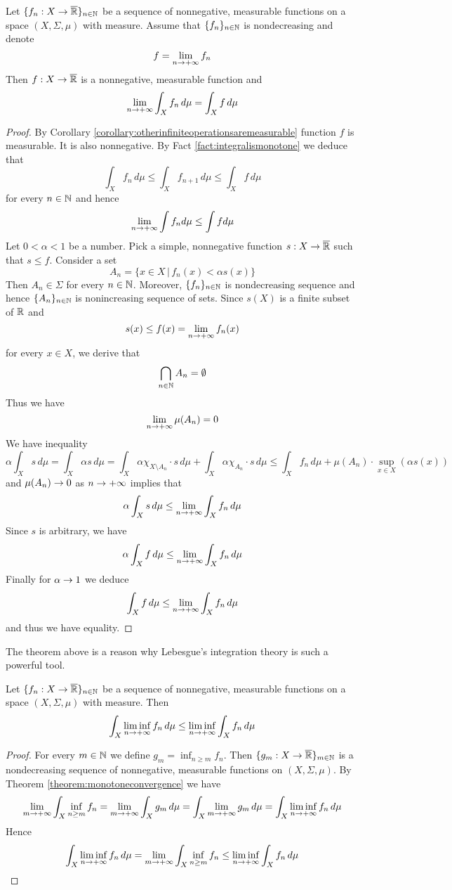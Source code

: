 \begin{theorem}\label{theorem:monotoneconvergence}
Let $\{f_n:X\rightarrow \overline{{\mathbb R}}\}_{n\in {\mathbb N}}$ be a sequence of nonnegative, measurable functions on a space $(X,\Sigma,\mu)$ with measure. Assume that $\{f_n\}_{n\in {\mathbb N}}$ is nondecreasing and denote
$$f = \lim_{n\rightarrow +\infty}f_n$$
Then $f:X\rightarrow \overline{{\mathbb R}}$ is a nonnegative, measurable function and
$$\lim_{n\rightarrow +\infty}\int_X f_n\, d\mu = \int_X f\, d\mu$$
\end{theorem}
\begin{proof}
By Corollary \ref{corollary:otherinfiniteoperationsaremeasurable} function $f$ is measurable. It is also nonnegative. By Fact \ref{fact:integralismonotone} we deduce that
$$\int_X f_n\,d\mu \leq \int_X f_{n+1}\,d\mu \leq \int_X f\, d\mu$$
for every $n\in {\mathbb N}$ and hence 
$$\lim_{n\rightarrow +\infty}\int f_n d\mu \leq \int f d\mu$$
Let $0 < \alpha < 1$ be a number. Pick a simple, nonnegative function $s:X\rightarrow \overline{{\mathbb R}}$ such that $s\leq f$. Consider a set
$$A_n = \big\{x\in X\,\big|\, f_n(x)< \alpha s(x)\big\}$$
Then $A_n\in \Sigma$ for every $n\in {\mathbb N}$. Moreover, $\{f_n\}_{n\in {\mathbb N}}$ is nondecreasing sequence and hence $\{A_n\}_{n\in {\mathbb N}}$ is nonincreasing sequence of sets. Since $s(X)$ is a finite subset of ${\mathbb R}$ and
$$s(x)\leq f(x) = \lim_{n\rightarrow +\infty}f_n(x)$$
for every $x\in X$, we derive that
$$\bigcap_{n\in {\mathbb N}}A_n = \emptyset$$
Thus we have
$$\lim_{n\rightarrow +\infty}\mu(A_n)=0$$
We have inequality
$$\alpha  \int_Xs\,d\mu = \int_X\alpha s\,d\mu = \int_X \alpha \chi_{X\setminus A_n}\cdot s\,d\mu +  \int_X \alpha \chi_{A_n}\cdot s\,d\mu \leq
\int_X f_n\,d\mu + \mu(A_n)\cdot \sup_{x\in X}\left(\alpha s(x)\right)$$
and $\mu(A_n)\rightarrow 0$ as $n\rightarrow +\infty$ implies that
$$\alpha  \int_Xs\,d\mu \leq \lim_{n\rightarrow +\infty}\int_Xf_n\,d\mu$$
Since $s$ is arbitrary, we have
$$\alpha  \int_Xf\,d\mu \leq \lim_{n\rightarrow +\infty}\int_Xf_n\,d\mu$$
Finally for $\alpha \rightarrow 1$ we deduce
$$\int_Xf\,d\mu \leq  \lim_{n\rightarrow +\infty}\int_Xf_n\,d\mu$$
and thus we have equality.
\end{proof}
\noindent
The theorem above is a reason why Lebesgue's integration theory is such a powerful tool.

\begin{theorem}\label{theorem:fatouslemma}
Let $\{f_n:X\rightarrow \overline{{\mathbb R}}\}_{n\in {\mathbb N}}$ be a sequence of nonnegative, measurable functions on a space $(X,\Sigma,\mu)$ with measure. Then
$$\int_X\liminf_{n\rightarrow +\infty}f_n\,d\mu \leq \liminf_{n\rightarrow +\infty}\int_Xf_n\,d\mu$$
\end{theorem}
\begin{proof}
For every $m\in {\mathbb N}$ we define $g_m = \inf_{n\geq m}f_n$. Then $\{g_m:X\rightarrow \overline{{\mathbb R}}\}_{m\in {\mathbb N}}$ is a nondecreasing sequence of nonnegative, measurable functions on $(X,\Sigma,\mu)$. By Theorem \ref{theorem:monotoneconvergence} we have
$$\lim_{m\rightarrow +\infty}\int_X\inf_{n\geq m}f_n = \lim_{m\rightarrow +\infty}\int_Xg_m\,d\mu = \int_X\lim_{m\rightarrow +\infty}g_m\,d\mu = \int_X\liminf_{n\rightarrow +\infty}f_n\,d\mu$$
Hence
$$\int_X\liminf_{n\rightarrow +\infty}f_n\,d\mu = \lim_{m\rightarrow +\infty}\int_X\inf_{n\geq m}f_n \leq \liminf_{n\rightarrow +\infty}\int_Xf_n\,d\mu$$
\end{proof}

